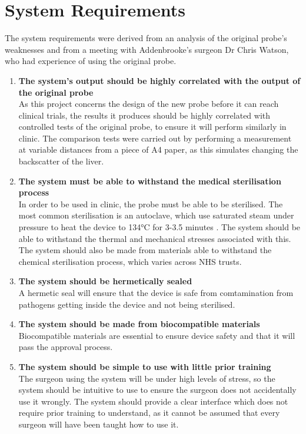 \section{System Requirements}

The system requirements were derived from an analysis of the original probe's weaknesses and from a meeting with Addenbrooke's surgeon Dr Chris Watson, who had experience of using the original probe.


\begin{enumerate}
\item \textbf{The system's output should be highly correlated with the output of the original probe}\\
As this project concerns the design of the new probe before it can reach clinical trials, the results it produces should be highly correlated with controlled tests of the original probe, to ensure it will perform similarly in clinic. The comparison tests were carried out by performing a measurement at variable distances from a piece of A4 paper, as this simulates changing the backscatter of the liver.

\item \textbf{The system must be able to withstand the medical sterilisation process}\\
In order to be used in clinic, the probe must be able to be sterilised. The most common sterilisation is an autoclave, which use saturated steam under pressure to heat the device to 134\si{\celsius} for 3-3.5 minutes \cite{nhs_autoclave}. The system should be able to withstand the thermal and mechanical stresses associated with this. The system should also be made from materials able to withstand the chemical sterilisation process, which varies across NHS trusts.

\item \textbf{The system should be hermetically sealed}\\
A hermetic seal will ensure that the device is safe from comtamination from pathogens getting inside the device and not being sterilised. 

\item \textbf{The system should be made from biocompatible materials}\\
Biocompatible materials are essential to ensure device safety and that it will pass the approval process.

\item \textbf{The system should be simple to use with little prior training}\\
The surgeon using the system will be under high levels of stress, so the system should be intuitive to use to ensure the surgeon does not accidentally use it wrongly. The system should provide a clear interface which does not require prior training to understand, as it cannot be assumed that every surgeon will have been taught how to use it.


\end{enumerate}

